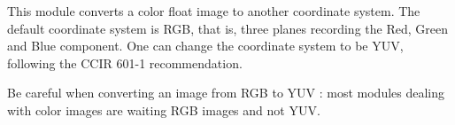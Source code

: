 This module converts a color float image to another coordinate system.
The default coordinate system is RGB, that is, three planes recording
the Red, Green and Blue component.
One can change the coordinate system to be YUV, following the 
CCIR 601-1 recommendation.

Be careful when converting an image from RGB to YUV : most modules 
dealing with color images are waiting RGB images and not YUV.
